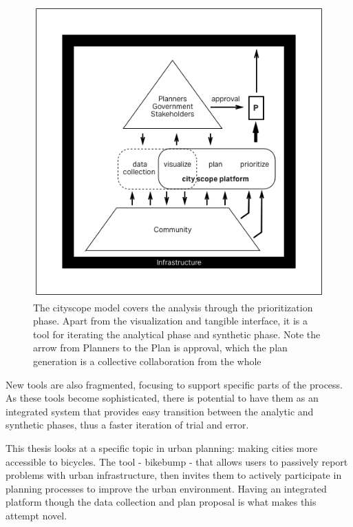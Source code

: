 \begin{figure}[!htb]
 	\includegraphics[width=\textwidth]{chapters/1/fig/cityscope.png}               
 	 \caption[diagram: cityscope model]{The cityscope model covers the analysis through the prioritization phase. Apart from the visualization and tangible interface, it is a tool
for iterating the analytical phase and synthetic phase. Note the arrow from Planners to the Plan is approval, which the plan generation is a collective collaboration from the whole \cite{moe2016illuminate}}
  	\label{fig:diagram_cityscope}
\end{figure}

New tools are also fragmented, focusing to support specific parts of the process. As these tools become sophisticated, there is potential to have them as an integrated system that provides easy transition between the analytic and synthetic phases, thus a faster iteration of trial and error. 

This thesis looks at a specific topic in urban planning: making cities more accessible to bicycles. The tool - bikebump - that allows users to passively report problems with urban infrastructure, then invites them to actively participate in planning processes to improve the urban environment. Having an integrated platform though the data collection and plan proposal is what makes this attempt novel.


